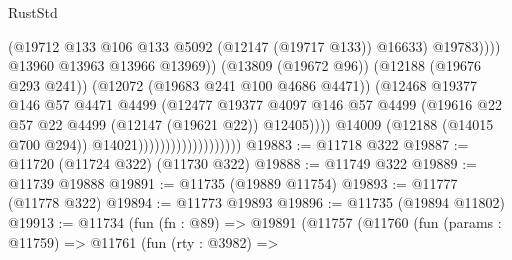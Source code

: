 \begin{lexlean}{RustStd}
\begin{coremodule}
                                                        (@19712
                                                          @133
                                                          @106
                                                          @133
                                                          @5092
                                                          (@12147 (@19717 @133))
                                                          @16633)
                                                        @19783))))
                                                @13960
                                                @13963
                                                @13966
                                                @13969))
                                            (@13809 (@19672 @96))
                                            (@12188 (@19676 @293 @241))
                                            (@12072 (@19683 @241 @100 @4686 @4471))
                                            (@12468
                                              @19377
                                              @146
                                              @57
                                              @4471
                                              @4499
                                              (@12477
                                                @19377
                                                @4097
                                                @146
                                                @57
                                                @4499
                                                (@19616
                                                  @22
                                                  @57
                                                  @22
                                                  @4499
                                                  (@12147 (@19621 @22))
                                                  @12405))))
                                          @14009
                                          (@12188 (@14015 @700 @294))
                                          @14021)))))))))))))))))))
@19883 := @11718 @322
@19887 := @11720 (@11724 @322) (@11730 @322)
@19888 := @11749 @322
@19889 := @11739 @19888
@19891 := @11735 (@19889 @11754)
@19893 := @11777 (@11778 @322)
@19894 := @11773 @19893
@19896 := @11735 (@19894 @11802)
@19913 := @11734
    (fun (fn : @89) =>
    @19891
      (@11757
        (@11760
          (fun (params : @11759) =>
          @11761
            (fun (rty : @3982) =>

\end{coremodule}
\end{lexlean}
